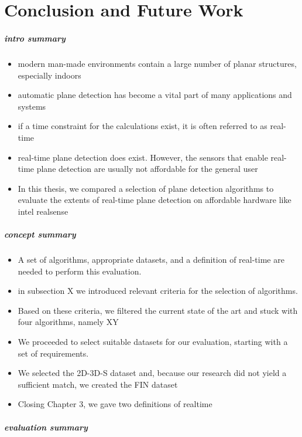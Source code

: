 \documentclass[main.tex]{subfiles}
\begin{document}
\chapter{Conclusion and Future Work}
\label{chap:concl}

\paragraph{intro summary}
\begin{itemize}
    \item modern man-made environments contain a large number of planar structures, especially indoors
    \item automatic plane detection has become a vital part of many applications and systems   
    \item if a time constraint for the calculations exist, it is often referred to as real-time 
    \item real-time plane detection does exist. However, the sensors that enable real-time plane detection are usually not affordable for the general user
    \item In this thesis, we compared a selection of plane detection algorithms to evaluate the extents of real-time plane detection on affordable hardware like intel realsense 
\end{itemize}


\paragraph{concept summary}
\begin{itemize}
    \item A set of algorithms, appropriate datasets, and a definition of real-time are needed to perform this evaluation.
    \item in subsection X we introduced relevant criteria for the selection of algorithms.
    \item Based on these criteria, we filtered the current state of the art and stuck with four algorithms, namely XY
    \item We proceeded to select suitable datasets for our evaluation, starting with a set of requirements. 
    \item We selected the 2D-3D-S dataset and, because our research did not yield a sufficient match, we created the FIN dataset
    \item Closing Chapter 3, we gave two definitions of realtime
\end{itemize}
\paragraph{evaluation summary}
\end{document}
